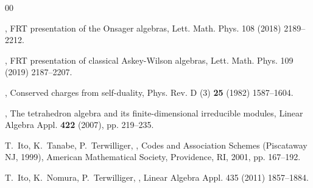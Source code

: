 \documentclass[11pt]{article}%
\theoremstyle{definition}
\theoremstyle{plain}
\begin{document}
\begin{thebibliography}{00}%
\small

,
	\newblock FRT presentation of the Onsager algebras,
	\newblock Lett. Math. Phys. 108 (2018) 2189--2212.
	
	
,
	\newblock FRT presentation of classical Askey-Wilson algebras, 
	\newblock Lett. Math. Phys. 109 (2019) 2187--2207.





, 
	\newblock Conserved charges from self-duality, 
	\newblock Phys. Rev. D (3) \textbf{25} (1982) 1587--1604.


,
	\newblock The tetrahedron algebra and its finite-dimensional irreducible modules,
	\newblock Linear Algebra Appl. \textbf{422} (2007), pp. 219--235.


 {T.~Ito, K.~Tanabe, P.~Terwilliger}, 
	,
	\newblock Codes and Association Schemes (Piscataway NJ, 1999), American Mathematical Society, Providence, RI, 2001, pp. 167--192.


	T.~Ito, K.~Nomura, P.~Terwilliger,
	,
	\newblock Linear Algebra Appl. 435 (2011) 1857--1884.
	

\end{thebibliography}
\end{document}
